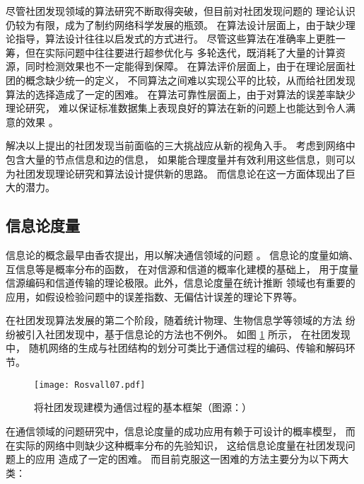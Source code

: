 
尽管社团发现领域的算法研究不断取得突破，但目前对社团发现问题的
理论认识仍较为有限，成为了制约网络科学发展的瓶颈。
在算法设计层面上，由于缺少理论指导，算法设计往往以启发式的方式进行。
尽管这些算法在准确率上更胜一筹，但在实际问题中往往要进行超参优化与
多轮迭代，既消耗了大量的计算资源，同时检测效果也不一定能得到保障。
在算法评价层面上，由于在理论层面社团的概念缺少统一的定义，
不同算法之间难以实现公平的比较，从而给社团发现算法的选择造成了一定的困难。
在算法可靠性层面上，由于对算法的误差率缺少理论研究，
难以保证标准数据集上表现良好的算法在新的问题上也能达到令人满意的效果
\cite{xiangxiang2021info}。

解决以上提出的社团发现当前面临的三大挑战应从新的视角入手。
考虑到网络中包含大量的节点信息和边的信息，
如果能合理度量并有效利用这些信息，则可以为社团发现理论研究和算法设计提供新的思路。
而信息论在这一方面体现出了巨大的潜力。

\subsection{信息论度量}
信息论的概念最早由香农提出，用以解决通信领域的问题 \cite{shannon1948mathematical}。
信息论的度量如熵、互信息等是概率分布的函数，
在对信源和信道的概率化建模的基础上，
用于度量信源编码和信道传输的理论极限。此外，信息论度量在统计推断
领域也有重要的应用，如假设检验问题中的误差指数、无偏估计误差的理论下界等。

在社团发现算法发展的第二个阶段，随着统计物理、生物信息学等领域的方法
纷纷被引入社团发现中，基于信息论的方法也不例外。
如图 \ref{fig:communication_community} 所示，
在社团发现中，
随机网络的生成与社团结构的划分可类比于通信过程的编码、传输和解码环节。


\begin{figure}[!ht]
    \texttt{[image: Rosvall07.pdf]}
    \caption{将社团发现建模为通信过程的基本框架（图源：）}
    \label{fig:communication_community}
\end{figure}

在通信领域的问题研究中，信息论度量的成功应用有赖于可设计的概率模型，
而在实际的网络中则缺少这种概率分布的先验知识，
这给信息论度量在社团发现问题上的应用
造成了一定的困难。
而目前克服这一困难的方法主要分为以下两大类：

